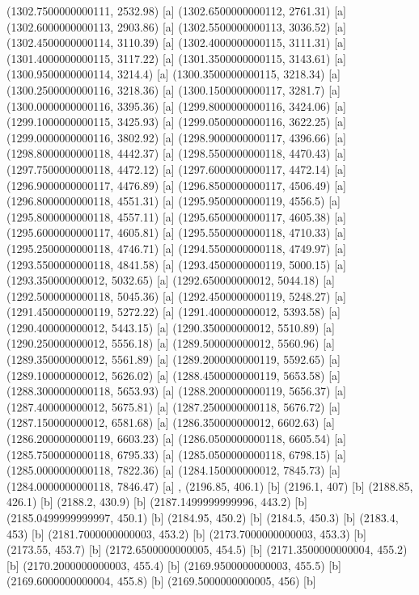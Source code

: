 {{{(1302.7500000000111, 2532.98) [a] 
(1302.6500000000112, 2761.31) [a] 
(1302.6000000000113, 2903.86) [a] 
(1302.5500000000113, 3036.52) [a] 
(1302.4500000000114, 3110.39) [a] 
(1302.4000000000115, 3111.31) [a] 
(1301.4000000000115, 3117.22) [a] 
(1301.3500000000115, 3143.61) [a] 
(1300.9500000000114, 3214.4) [a] 
(1300.3500000000115, 3218.34) [a] 
(1300.2500000000116, 3218.36) [a] 
(1300.1500000000117, 3281.7) [a] 
(1300.0000000000116, 3395.36) [a] 
(1299.8000000000116, 3424.06) [a] 
(1299.1000000000115, 3425.93) [a] 
(1299.0500000000116, 3622.25) [a] 
(1299.0000000000116, 3802.92) [a] 
(1298.9000000000117, 4396.66) [a] 
(1298.8000000000118, 4442.37) [a] 
(1298.5500000000118, 4470.43) [a] 
(1297.7500000000118, 4472.12) [a] 
(1297.6000000000117, 4472.14) [a] 
(1296.9000000000117, 4476.89) [a] 
(1296.8500000000117, 4506.49) [a] 
(1296.8000000000118, 4551.31) [a] 
(1295.9500000000119, 4556.5) [a] 
(1295.8000000000118, 4557.11) [a] 
(1295.6500000000117, 4605.38) [a] 
(1295.6000000000117, 4605.81) [a] 
(1295.5500000000118, 4710.33) [a] 
(1295.2500000000118, 4746.71) [a] 
(1294.5500000000118, 4749.97) [a] 
(1293.5500000000118, 4841.58) [a] 
(1293.4500000000119, 5000.15) [a] 
(1293.350000000012, 5032.65) [a] 
(1292.650000000012, 5044.18) [a] 
(1292.5000000000118, 5045.36) [a] 
(1292.4500000000119, 5248.27) [a] 
(1291.4500000000119, 5272.22) [a] 
(1291.400000000012, 5393.58) [a] 
(1290.400000000012, 5443.15) [a] 
(1290.350000000012, 5510.89) [a] 
(1290.250000000012, 5556.18) [a] 
(1289.500000000012, 5560.96) [a] 
(1289.350000000012, 5561.89) [a] 
(1289.2000000000119, 5592.65) [a] 
(1289.100000000012, 5626.02) [a] 
(1288.4500000000119, 5653.58) [a] 
(1288.3000000000118, 5653.93) [a] 
(1288.2000000000119, 5656.37) [a] 
(1287.400000000012, 5675.81) [a] 
(1287.2500000000118, 5676.72) [a] 
(1287.150000000012, 6581.68) [a] 
(1286.350000000012, 6602.63) [a] 
(1286.2000000000119, 6603.23) [a] 
(1286.0500000000118, 6605.54) [a] 
(1285.7500000000118, 6795.33) [a] 
(1285.0500000000118, 6798.15) [a] 
(1285.0000000000118, 7822.36) [a] 
(1284.150000000012, 7845.73) [a] 
(1284.0000000000118, 7846.47) [a] 
},{
(2196.85, 406.1) [b] 
(2196.1, 407) [b] 
(2188.85, 426.1) [b] 
(2188.2, 430.9) [b] 
(2187.1499999999996, 443.2) [b] 
(2185.0499999999997, 450.1) [b] 
(2184.95, 450.2) [b] 
(2184.5, 450.3) [b] 
(2183.4, 453) [b] 
(2181.7000000000003, 453.2) [b] 
(2173.7000000000003, 453.3) [b] 
(2173.55, 453.7) [b] 
(2172.6500000000005, 454.5) [b] 
(2171.3500000000004, 455.2) [b] 
(2170.2000000000003, 455.4) [b] 
(2169.9500000000003, 455.5) [b] 
(2169.6000000000004, 455.8) [b] 
(2169.5000000000005, 456) [b] 
}}}
